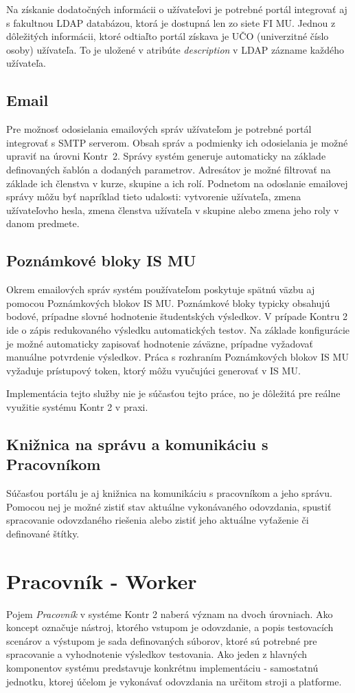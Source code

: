 \documentclass[
  digital, %
  twoside, %
  table,   %
  lof,     %
  lot,     %
]{fithesis3}
\begin{document}
Na získanie dodatočných informácii o užívateľovi je potrebné portál integrovať aj s fakultnou LDAP databázou, ktorá je dostupná len zo siete FI MU. Jednou z dôležitých informácii, ktoré odtiaľto portál získava je UČO (univerzitné číslo osoby) užívateľa. To je uložené v atribúte \emph{description} v LDAP zázname každého užívateľa.

\subsection{Email}
Pre možnosť odosielania emailových správ užívateľom je potrebné portál integrovať s SMTP serverom. Obsah správ a podmienky ich odosielania je možné upraviť na úrovni Kontr~2. Správy systém generuje automaticky na základe definovaných šablón a dodaných parametrov. Adresátov je možné filtrovať na základe ich členstva v kurze, skupine a ich rolí. Podnetom na odoslanie emailovej správy môžu byť napríklad tieto udalosti: vytvorenie užívateľa, zmena užívateľovho hesla, zmena členstva užívateľa v skupine alebo zmena jeho roly v danom predmete.

\subsection{Poznámkové bloky IS MU}
Okrem emailových správ systém používateľom poskytuje spätnú väzbu aj pomocou Poznámkových blokov IS MU. Poznámkové bloky typicky obsahujú bodové, prípadne slovné hodnotenie študentských výsledkov. V prípade Kontru 2 ide o zápis redukovaného výsledku automatických testov. Na základe konfigurácie je možné automaticky zapisovať hodnotenie záväzne, prípadne vyžadovať manuálne potvrdenie výsledkov. Práca s rozhraním Poznámkových blokov IS MU vyžaduje prístupový token, ktorý môžu vyučujúci generovať v IS MU.

Implementácia tejto služby nie je súčasťou tejto práce, no je dôležitá pre reálne využitie systému Kontr 2 v praxi.

\subsection{Knižnica na správu a komunikáciu s Pracovníkom}
Súčasťou portálu je aj knižnica na komunikáciu s pracovníkom a jeho správu. Pomocou nej je možné zistiť stav aktuálne vykonávaného odovzdania, spustiť spracovanie odovzdaného riešenia alebo zistiť jeho aktuálne vyťaženie či definované štítky.

\section{Pracovník - Worker}
Pojem \emph{Pracovník} v systéme Kontr 2 naberá význam na dvoch úrovniach. Ako koncept označuje nástroj, ktorého vstupom je odovzdanie, a popis testovacích scenárov a výstupom je sada definovaných súborov, ktoré sú potrebné pre spracovanie a vyhodnotenie výsledkov testovania. Ako jeden z hlavných komponentov systému predstavuje konkrétnu implementáciu - samostatnú jednotku, ktorej účelom je vykonávať odovzdania na určitom stroji a platforme. 
\end{document}
